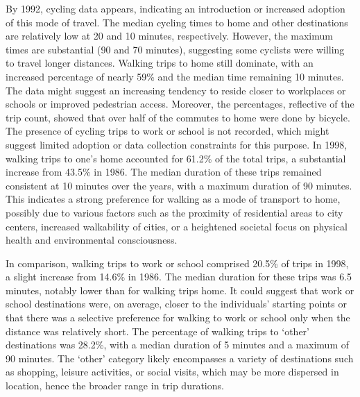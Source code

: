 \documentclass[
11pt, %
oneside, %
english, %
singlespacing, %
]{macthesis} %
\begin{document}
By 1992, cycling data appears, indicating an introduction or increased adoption of this mode of travel. The median cycling times to home and other destinations are relatively low at 20 and 10 minutes, respectively. However, the maximum times are substantial (90 and 70 minutes), suggesting some cyclists were willing to travel longer distances. Walking trips to home still dominate, with an increased percentage of nearly 59\% and the median time remaining 10 minutes. The data might suggest an increasing tendency to reside closer to workplaces or schools or improved pedestrian access. Moreover, the percentages, reflective of the trip count, showed that over half of the commutes to home were done by bicycle. The presence of cycling trips to work or school is not recorded, which might suggest limited adoption or data collection constraints for this purpose. In 1998, walking trips to one's home accounted for 61.2\% of the total trips, a substantial increase from 43.5\% in 1986. The median duration of these trips remained consistent at 10 minutes over the years, with a maximum duration of 90 minutes. This indicates a strong preference for walking as a mode of transport to home, possibly due to various factors such as the proximity of residential areas to city centers, increased walkability of cities, or a heightened societal focus on physical health and environmental consciousness.

In comparison, walking trips to work or school comprised 20.5\% of trips in 1998, a slight increase from 14.6\% in 1986. The median duration for these trips was 6.5 minutes, notably lower than for walking trips home. It could suggest that work or school destinations were, on average, closer to the individuals' starting points or that there was a selective preference for walking to work or school only when the distance was relatively short. The percentage of walking trips to `other' destinations was 28.2\%, with a median duration of 5 minutes and a maximum of 90 minutes. The `other' category likely encompasses a variety of destinations such as shopping, leisure activities, or social visits, which may be more dispersed in location, hence the broader range in trip durations.
\end{document}
